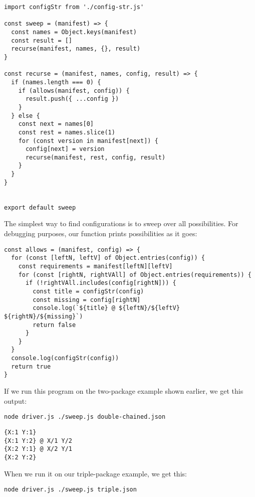 \documentclass[krantzl]{krantz}
\begin{document}
\begin{lstlisting}[frame=tblr]
import configStr from './config-str.js'

const sweep = (manifest) => {
  const names = Object.keys(manifest)
  const result = []
  recurse(manifest, names, {}, result)
}

const recurse = (manifest, names, config, result) => {
  if (names.length === 0) {
    if (allows(manifest, config)) {
      result.push({ ...config })
    }
  } else {
    const next = names[0]
    const rest = names.slice(1)
    for (const version in manifest[next]) {
      config[next] = version
      recurse(manifest, rest, config, result)
    }
  }
}


export default sweep
\end{lstlisting}



The simplest way to find configurations is to sweep over all possibilities.
For debugging purposes,
our function prints possibilities as it goes:


\begin{lstlisting}[frame=tblr]
const allows = (manifest, config) => {
  for (const [leftN, leftV] of Object.entries(config)) {
    const requirements = manifest[leftN][leftV]
    for (const [rightN, rightVAll] of Object.entries(requirements)) {
      if (!rightVAll.includes(config[rightN])) {
        const title = configStr(config)
        const missing = config[rightN]
        console.log(`${title} @ ${leftN}/${leftV} ${rightN}/${missing}`)
        return false
      }
    }
  }
  console.log(configStr(config))
  return true
}
\end{lstlisting}



If we run this program on the two-package example shown earlier, we get this output:


\begin{lstlisting}[frame=shadowbox]
node driver.js ./sweep.js double-chained.json
\end{lstlisting}



\begin{lstlisting}[frame=tblr,backgroundcolor=\color{black!5}]
{X:1 Y:1}
{X:1 Y:2} @ X/1 Y/2
{X:2 Y:1} @ X/2 Y/1
{X:2 Y:2}
\end{lstlisting}



When we run it on our triple-package example, we get this:


\begin{lstlisting}[frame=shadowbox]
node driver.js ./sweep.js triple.json
\end{lstlisting}
\end{document}
